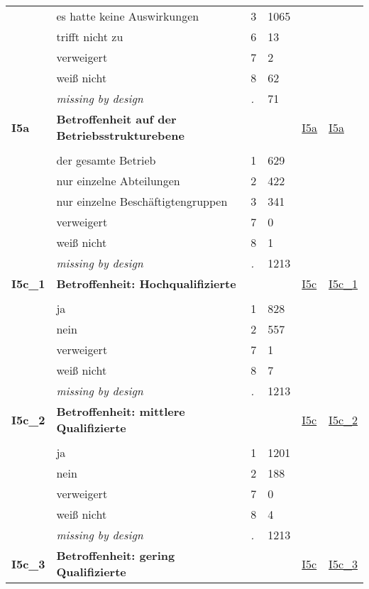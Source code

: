 \begin{longtable}{| L{2.45cm} | L{6cm} | C{1.5cm} | R{1cm} | C{2.25cm} | C{2.25cm} |}
   & es hatte keine Auswirkungen & 3 & 1065 &  &  \\ 
   & trifft nicht zu & 6 & 13 &  &  \\ 
   & verweigert & 7 & 2 &  &  \\ 
   & weiß nicht & 8 & 62 &  &  \\ 
   & \textit{missing by design} & \textit{.} & 71 &  &  \\ 
   \midrule
\textbf{I5a}\label{var:I5a} & \textbf{Betroffenheit auf der Betriebsstrukturebene} &  &  & \hyperref[I5a]{I5a} & \hyperref[var:suf:I5a]{I5a} \\ 
   &  &  &  &  &  \\ 
   & der gesamte Betrieb & 1 & 629 &  &  \\ 
   & nur einzelne Abteilungen & 2 & 422 &  &  \\ 
   & nur einzelne Beschäftigtengruppen & 3 & 341 &  &  \\ 
   & verweigert & 7 & 0 &  &  \\ 
   & weiß nicht & 8 & 1 &  &  \\ 
   & \textit{missing by design} & \textit{.} & 1213 &  &  \\ 
   \midrule
\textbf{I5c\_1}\label{var:I5c:1} & \textbf{Betroffenheit: Hochqualifizierte} &  &  & \hyperref[I5c]{I5c} & \hyperref[var:suf:I5c:1]{I5c\_1} \\ 
   &  &  &  &  &  \\ 
   & ja & 1 & 828 &  &  \\ 
   & nein & 2 & 557 &  &  \\ 
   & verweigert & 7 & 1 &  &  \\ 
   & weiß nicht & 8 & 7 &  &  \\ 
   & \textit{missing by design} & \textit{.} & 1213 &  &  \\ 
   \midrule
\textbf{I5c\_2}\label{var:I5c:2} & \textbf{Betroffenheit: mittlere Qualifizierte} &  &  & \hyperref[I5c]{I5c} & \hyperref[var:suf:I5c:2]{I5c\_2} \\ 
   &  &  &  &  &  \\ 
   & ja & 1 & 1201 &  &  \\ 
   & nein & 2 & 188 &  &  \\ 
   & verweigert & 7 & 0 &  &  \\ 
   & weiß nicht & 8 & 4 &  &  \\ 
   & \textit{missing by design} & \textit{.} & 1213 &  &  \\ 
   \midrule
\textbf{I5c\_3}\label{var:I5c:3} & \textbf{Betroffenheit: gering Qualifizierte} &  &  & \hyperref[I5c]{I5c} & \hyperref[var:suf:I5c:3]{I5c\_3} \\ 

\end{longtable}
